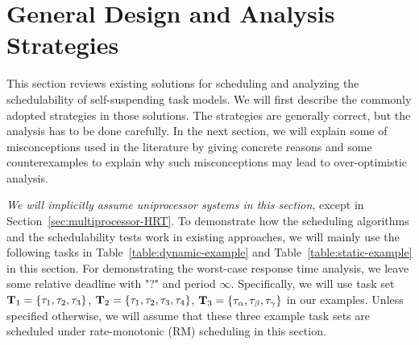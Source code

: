 \section{General Design and Analysis Strategies}
\label{sec:review}

This section reviews existing solutions for scheduling and analyzing the schedulability of self-suspending task models. We will first describe the commonly adopted strategies in those solutions. The  strategies are generally correct, but the analysis has to be done carefully.  In the next section, we will explain some of misconceptions used in the literature by giving concrete reasons and some counterexamples to explain why such misconceptions may lead to over-optimistic analysis. 

\emph{We will implicitly assume uniprocessor systems in this section}, except in Section~\ref{sec:multiprocessor-HRT}.
To demonstrate how the scheduling algorithms and the schedulability tests work in existing approaches, we will mainly use the following tasks in Table~\ref{table:dynamic-example} and Table~\ref{table:static-example} in this section. For demonstrating the worst-case response time analysis, we leave some relative deadline with "?" and period $\infty$. Specifically, we will use task set ${\bf T}_1 = \left\{{\tau_1, \tau_2, \tau_3}\right\}$, ${\bf T}_2 = \left\{{\tau_1, \tau_2, \tau_3, \tau_4}\right\}$, ${\bf T}_3 = \left\{{\tau_\alpha, \tau_\beta, \tau_\gamma}\right\}$ in our examples. Unless specified otherwise, we will assume that these three example task sets are scheduled under rate-monotonic (RM) scheduling in this section. 

